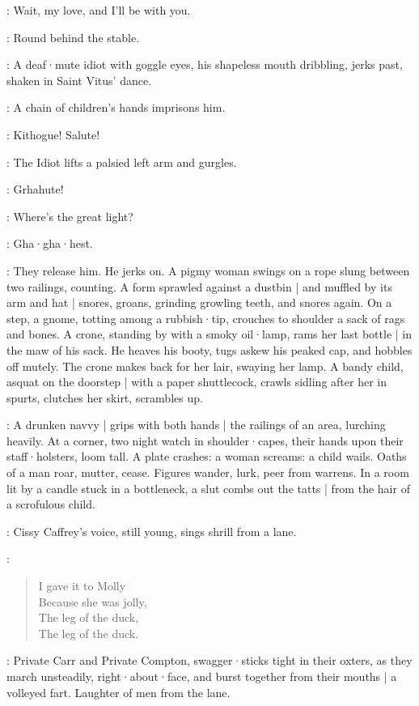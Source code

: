 \Calls:
Wait,
my love,
and I'll be with you.

\Answers:
Round behind the stable.

:
A deaf·mute idiot with goggle eyes,
his shapeless mouth dribbling,
jerks past,
shaken in Saint Vitus' dance.

:
A chain of children's hands imprisons him.

\Children:
Kithogue!
Salute!

:
The Idiot lifts a palsied left arm and gurgles.

\Idiot:
Grhahute!%

\Children:
Where's the great light?

\Idiot:
Gha·gha·hest.

:
They release him.
He jerks on.
A pigmy woman swings on a rope slung between two railings,
counting.
A form sprawled against a dustbin |
and muffled by its arm and hat |
snores,
groans,
grinding growling teeth,
and snores again.
On a step,
a gnome,
totting among a rubbish·tip,
crouches to shoulder a sack of rags and bones.
A crone,
standing by with a smoky oil·lamp,
rams her last bottle |
in the maw of his sack.
He heaves his booty,
tugs askew his peaked cap,
and hobbles off mutely.
The crone makes back for her lair,
swaying her lamp.
A bandy child,
asquat on the doorstep |
with a paper shuttlecock,
crawls sidling after her in spurts,
clutches her skirt,
scrambles up.

:
A drunken navvy |
grips with both hands |
the railings of an area,
lurching heavily.
At a corner,
two night watch in shoulder·capes,
their hands upon their staff·holsters,
loom tall.
A plate crashes:
a woman screams:
a child wails.
Oaths of a man roar,
mutter,
cease.
Figures wander,
lurk,
peer from warrens.
In a room lit by a candle stuck in a bottleneck,
a slut combs out the tatts |
from the hair of a scrofulous child.

:
Cissy Caffrey's voice,
still young,
sings shrill from a lane.

\Cissy:
\begin{verse}
    I gave it to Molly\\
    Because she was jolly,\\
    The leg of the duck,\\
    The leg of the duck.
\end{verse}

:
Private Carr and Private Compton,
swagger·sticks tight in their oxters,
as they march unsteadily,
right·about·face,
and burst together from their mouths |
a volleyed fart.
Laughter of men from the lane.

